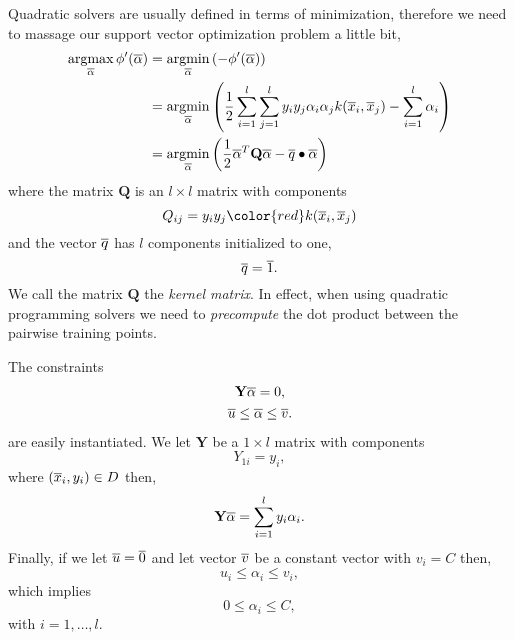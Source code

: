 \documentclass[a4paper,blends,pdf,colorBG,slideColor]{prosper}
\begin{document}
\es

\small
Quadratic solvers are usually defined in terms of minimization, therefore we need to
massage our support vector optimization problem a little bit,
\begin{align*}
\argmax_{\ol{\alpha}}  \phi'(\ol{\alpha}) &= \argmin_{\ol{\alpha}} \left (- \phi'(\ol{\alpha})\right ) \nonumber\\
\label{eq:lagrangian-dual-impl-min}
	&= \argmin_{\ol{\alpha}}  
	 \left (\frac{1}{2}\sum_{i=1}^l\sum_{j=1}^l y_i y_j \alpha_i \alpha_j k(\ol{x}_i,\ol{x}_j) 
 		 - \sum_{i=1}^l \alpha_i \right )\\
	&= \argmin_{\ol{\alpha}} \left (\frac{1}{2} \ol{\alpha}^T {\mathbf Q}\ol{\alpha} - \ol{q}\bullet\ol{\alpha}  \right )
\end{align*}
where the matrix $\mathbf Q$ is an $l\times l$ matrix with components 
\begin{equation*}
Q_{ij} = y_i y_j {\color{red}k(\ol{x}_i,\ol{x}_j)}
\end{equation*}
and the vector $\overline{q}$ has $l$ components initialized to one,
\begin{equation*}
\overline{q} = \overline{1}.
\end{equation*}
We call the matrix $\mathbf Q$ the {\em kernel matrix}. In effect, when using quadratic programming
solvers we need to {\em precompute} the dot product between the pairwise training points.
\es

\small
The constraints 
\begin{gather*}
{\mathbf Y} \overline{\alpha} = 0,\\
\overline{u} \le \overline{\alpha} \le \overline{v}.
\end{gather*}
are easily instantiated. We let $\mathbf Y$ be a $1 \times l$ matrix with components
\begin{equation*}
Y_{1i} = y_i,
\end{equation*}
where $(\overline{x}_i,y_i) \in D$ then,
\begin{equation*}
{\mathbf Y} \overline{\alpha} = \sum_{i = 1}^l y_i \alpha_i.
\end{equation*}
Finally, if we let $\overline{u} = \overline{0}$  and  let
vector $\overline{v}$ be a constant vector with $v_i = C$ then,
\begin{equation*}
u_i \le \alpha_i \le v_i,
\end{equation*}
which implies
\begin{equation*}
0 \le \alpha_i \le C,
\end{equation*}
with $i = 1,\ldots,l$.
\end{document}
